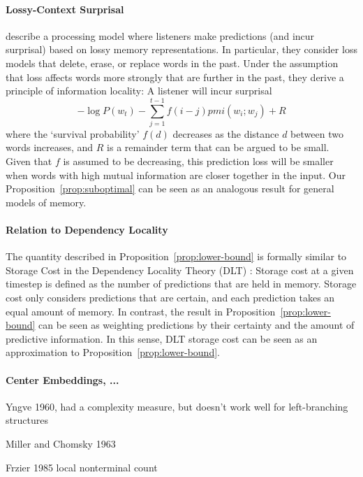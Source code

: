 \documentclass[11pt,letterpaper]{article}
\begin{document}
\paragraph{Lossy-Context Surprisal}
\citet{futrell-noisy-context-2017} describe a processing model where listeners make predictions (and incur surprisal) based on lossy memory representations.
In particular, they consider loss models that delete, erase, or replace words in the past.
Under the assumption that loss affects words more strongly that are further in the past, they derive a principle of information locality:
A listener will incur surprisal
$$ -\log P(w_t) - \sum_{j=1}^{t-1} f(i-j) pmi(w_i; w_j) + R$$
where the `survival probability' $f(d)$ decreases as the distance $d$ between two words increases, and $R$ is a remainder term that can be argued to be small.
Given that $f$ is assumed to be decreasing, this prediction loss will be smaller when words with high mutual information are closer together in the input.
Our Proposition~\ref{prop:suboptimal} can be seen as an analogous result for general models of memory.






\paragraph{Relation to Dependency Locality}
The quantity described in Proposition~\ref{prop:lower-bound} is formally similar to Storage Cost in the Dependency Locality Theory (DLT) \citep{gibson-linguistic-1998}: Storage cost at a given timestep is defined as the number of predictions that are held in memory.
Storage cost only considers predictions that are certain, and each prediction takes an equal amount of memory.
In contrast, the result in Proposition~\ref{prop:lower-bound} can be seen as weighting predictions by their certainty and the amount of predictive information.
In this sense, DLT storage cost can be seen as an approximation to Proposition~\ref{prop:lower-bound}.



\paragraph{Center Embeddings, ...}
Yngve 1960, had a complexity measure, but doesn't work well for left-branching structures

Miller and Chomsky 1963

Frzier 1985 local nonterminal count
\end{document}
